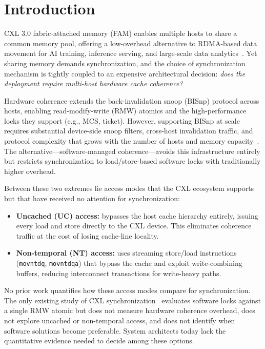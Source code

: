 \section{Introduction}

CXL 3.0 fabric-attached memory (FAM) enables multiple hosts to share a common memory pool, offering a low-overhead alternative to RDMA-based data movement for AI training, inference serving, and large-scale data analytics~\cite{tangYggdrasilReducingNetwork2024}.
Yet sharing memory demands synchronization, and the choice of synchronization mechanism is tightly coupled to an expensive architectural decision: \emph{does the deployment require multi-host hardware cache coherence?}

Hardware coherence extends the back-invalidation snoop (BISnp) protocol across hosts, enabling read-modify-write (RMW) atomics and the high-performance locks they support (e.g., MCS, ticket).
However, supporting BISnp at scale requires substantial device-side snoop filters, cross-host invalidation traffic, and protocol complexity that grows with the number of hosts and memory capacity~\cite{goukDirectAccessHighPerformance}.
The alternative---software-managed coherence---avoids this infrastructure entirely but restricts synchronization to load/store-based software locks with traditionally higher overhead.

Between these two extremes lie access modes that the CXL ecosystem supports but that have received no attention for synchronization:
\begin{itemize}
    \item \textbf{Uncached (UC) access:} bypasses the host cache hierarchy entirely, issuing every load and store directly to the CXL device. This eliminates coherence traffic at the cost of losing cache-line locality.
    \item \textbf{Non-temporal (NT) access:} uses streaming store/load instructions (\texttt{movntdq}, \texttt{movntdqa}) that bypass the cache and exploit write-combining buffers, reducing interconnect transactions for write-heavy paths.
\end{itemize}

No prior work quantifies how these access modes compare for synchronization.
The only existing study of CXL synchronization~\cite{suetterleinSynchronizationCXLBased2024} evaluates software locks against a single RMW atomic but does not measure hardware coherence overhead, does not explore uncached or non-temporal access, and does not identify when software solutions become preferable.
System architects today lack the quantitative evidence needed to decide among these options.

